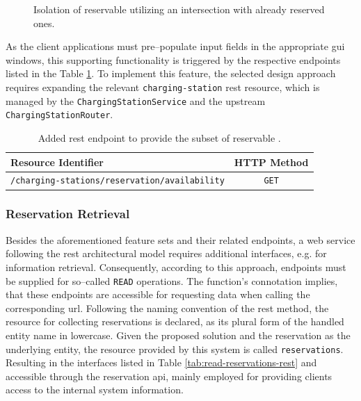 \begin{figure}[h]
    \centering
    \caption{Isolation of reservable  utilizing an intersection with already reserved ones.}
    \label{fig:reservable-cs}
\end{figure}

\noindent As the client applications must pre--populate input fields in the appropriate \acrshort{gui} windows, this supporting functionality is triggered by the respective endpoints listed in the Table \ref{tab:reservable-cs-rest}. To implement this feature, the selected design approach requires expanding the relevant \texttt{charging-station} \acrshort{rest} resource, which is managed by the \texttt{ChargingStationService} and the upstream \texttt{ChargingStationRouter}.

\begingroup
\setlength{\tabcolsep}{10pt} %
\renewcommand{\arraystretch}{1.5} %
\begin{table}[h]
\centering
\caption{Added \acrshort{rest} endpoint to provide the subset of reservable .}
    \begin{tabular}{l|c}
    Resource Identifier & HTTP Method \\ \hline
    \texttt{/charging-stations/reservation/availability} & \texttt{GET}
    \end{tabular}
\label{tab:reservable-cs-rest}
\end{table}
\endgroup

\subsubsection{Reservation Retrieval}
\label{ch:Implementation:sec:Reservation System:ssec:Additional Capabilities:sssec:Reservation Retrieval}

Besides the aforementioned feature sets and their related endpoints, a web service following the \acrshort{rest} architectural model requires additional interfaces, e.g. for information retrieval.
Consequently, according to this approach, endpoints must be supplied for so--called \texttt{READ} operations. The function's connotation implies, that these endpoints are accessible for requesting data when calling the corresponding \acrshort{url}.
Following the naming convention of the \acrshort{rest} method, the resource for collecting reservations is declared, as its plural form of the handled entity name in lowercase. Given the proposed solution and the reservation as the underlying entity, the resource provided by this system is called \texttt{reservations}.
Resulting in the interfaces listed in Table \ref{tab:read-reservations-rest} and accessible through the reservation \acrshort{api}, mainly employed for providing clients access to the internal system information.

